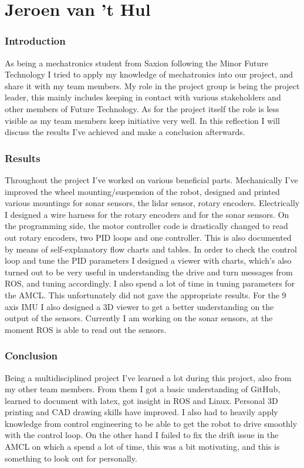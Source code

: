 \section{Jeroen van 't Hul}
\subsubsection{Introduction}
As being a mechatronics student from Saxion following the Minor Future Technology I tried to apply my knowledge of mechatronics into our project, and share it with my team members. My role in the project group is being the project leader, this mainly includes keeping in contact with various stakeholders and other members of Future Technology. As for the project itself the role is less visible as my team members keep initiative very well. 
In this reflection I will discuss the results I've achieved and make a conclusion afterwards.


\subsubsection{Results}
Throughout the project I've worked on various beneficial parts. Mechanically I've improved the wheel mounting/suspension of the robot, designed and printed various mountings for sonar sensors, the lidar sensor, rotary encoders. Electrically I designed a wire harness for the rotary encoders and for the sonar sensors. On the programming side, the motor controller code is drastically changed to read out rotary encoders, two PID loops and one controller. This is also documented by means of self-explanatory flow charts and tables. In order to check the control loop and tune the PID parameters I designed a viewer with charts, which’s also turned out to be very useful in understanding the drive and turn messages from ROS, and tuning accordingly.
I also spend a lot of time in tuning parameters for the AMCL. This unfortunately did not gave the appropriate results. 
For the 9 axis IMU I also designed a 3D viewer to get a better understanding on the output of the sensors.
Currently I am working on the sonar sensors, at the moment ROS is able to read out the sensors.

\subsubsection{Conclusion}
Being a multidisciplined project I've learned a lot during this project, also from my other team members. From them I got a basic understanding of GitHub, learned to document with latex, got insight in ROS and Linux. Personal 3D printing and CAD drawing skills have improved. I also had to heavily apply knowledge from control engineering to be able to get the robot to drive smoothly with the control loop. On the other hand I failed to fix the drift issue in the AMCL on which a spend a lot of time, this was a bit motivating, and this is something to look out for personally. 

